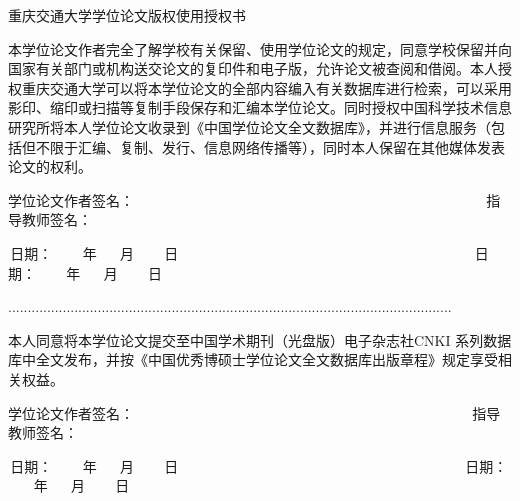 \documentclass[a4paper,12pt,CJK,openany]{ctexbook}
\newcommand{\sanhao}{\fontsize{15.75pt}{\baselineskip}\selectfont}
\newcommand{\wuhao}{\fontsize{10.5pt}{\baselineskip}\selectfont}    %
\newcommand{\xiaowuhao}{\fontsize{9pt}{\baselineskip}\selectfont}   %
\begin{document}
\vspace{1cm}
\begin{center}
    \kaishu \sanhao  重庆交通大学学位论文版权使用授权书
\end{center}
\vspace{0.3cm}

本学位论文作者完全了解学校有关保留、使用学位论文的规定，同意学校保留并向国家有关部门或机构送交论文的复印件和电子版，允许论文被查阅和借阅。本人授权重庆交通大学可以将本学位论文的全部内容编入有关数据库进行检索，可以采用影印、缩印或扫描等复制手段保存和汇编本学位论文。同时授权中国科学技术信息研究所将本人学位论文收录到《中国学位论文全文数据库》，并进行信息服务（包括但不限于汇编、复制、发行、信息网络传播等），同时本人保留在其他媒体发表论文的权利。

\vspace{0.3cm}


学位论文作者签名：    ~~~~~~~~~~~~~~~~~~~~~~~~~~~~~~~~~~~~~~~~~~~~~~~~~           指导教师签名：~~~~~~~~~~~

\,日期：  ~~~ 年 ~~   月  ~~~  日  ~~~~~~~~~~~~~~~~~~~~~~~~~~~~~~~~~~~~~~~~~       日期： ~~~    年  ~~ 月 ~~~   日

{..................................................................................................................}

\vspace{0.3cm}
本人同意将本学位论文提交至中国学术期刊（光盘版）电子杂志社CNKI 系列数据库中全文发布，并按《中国优秀博硕士学位论文全文数据库出版章程》规定享受相关权益。

\vspace{0.3cm}

学位论文作者签名：   ~~~~~~~~~~~~~~~~~~~~~~~~~~~~~~~~~~~~~~~~~~~~~~~             指导教师签名：~~~~~~~~~~~

\,日期：  ~~~ 年 ~~   月  ~~~  日  ~~~~~~~~~~~~~~~~~~~~~~~~~~~~~~~~~~~~~~  ~      日期： ~~~    年  ~~ 月 ~~~   日




\setcounter{page}{0}
\newpage

\pagestyle{plain}
\fancyhead{}%
\topskip 54pt
\fancyfoot[C]{\songti \xiaowuhao  \thepage}
\renewcommand{\headrulewidth}{0.8pt}

\end{document}
